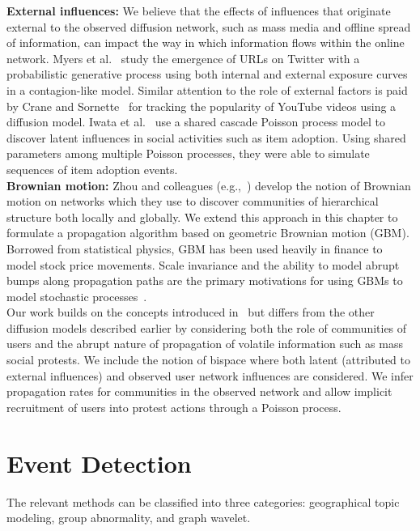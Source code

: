 \noindent
{\bf External influences:}
We believe that the effects of influences that originate external
to the observed diffusion network, such as mass media
and offline spread of information, can impact the way in which information
flows within the online network.
Myers et al.~\cite{myers2012information} study the emergence of URLs
on Twitter with a probabilistic generative process using both
internal and external exposure curves in a contagion-like model.
Similar attention to the role of external factors is
paid by Crane and Sornette~\cite{crane2008robust} for
tracking the popularity of YouTube videos using a diffusion model.
Iwata et al.~\cite{iwata2013discovering} use
a shared cascade Poisson process model to discover
latent influences in social activities such as item adoption.
Using shared parameters among multiple Poisson processes, they were able to simulate sequences of item adoption events. \\


\noindent
{\bf Brownian motion:}
Zhou and colleagues (e.g.,~\cite{zhou2003distance, zhou2003network,
zhou2004network}) develop the notion of Brownian motion on networks
which they
use to discover communities of hierarchical structure both locally
and globally. We extend this approach in this chapter
to formulate a propagation algorithm based on geometric Brownian
motion (GBM). Borrowed from statistical physics, GBM has been
used heavily in finance to model stock price movements.
Scale invariance and the ability to model abrupt bumps
along propagation paths are the primary motivations for using GBMs
to model stochastic processes~\cite{tankov2004financial}. \\

\noindent
Our work builds on the concepts
introduced in~\cite{zhou2003network, iwata2013discovering, zhou2003distance, zhou2004network} but differs from the other diffusion models
described earlier by considering both the role of communities of
users and the abrupt nature of propagation of volatile information such as mass social protests. We include the notion of bispace where both latent (attributed to external influences) and observed user network influences are considered. We infer propagation rates for communities in the observed network and allow
implicit recruitment of users into protest actions through a Poisson process.


\section{Event Detection}
The relevant methods can be classified into three categories: geographical topic modeling, group abnormality, and graph wavelet.


